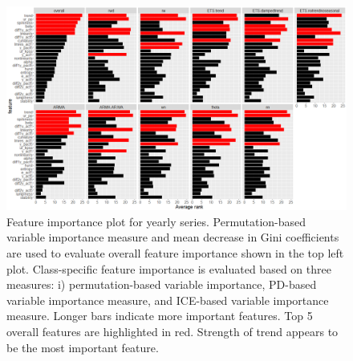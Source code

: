 \documentclass[11pt,a4paper,]{article}
\begin{document}
\begin{figure}
\centering
\includegraphics{figures/viyearly-1.png}
\caption{\label{fig:viyearly}Feature importance plot for yearly series.
Permutation-based variable importance measure and mean decrease in Gini
coefficients are used to evaluate overall feature importance shown in
the top left plot. Class-specific feature importance is evaluated based
on three measures: i) permutation-based variable importance, PD-based
variable importance measure, and ICE-based variable importance measure.
Longer bars indicate more important features. Top 5 overall features are
highlighted in red. Strength of trend appears to be the most important
feature.}
\end{figure}

\newpage
\end{document}
